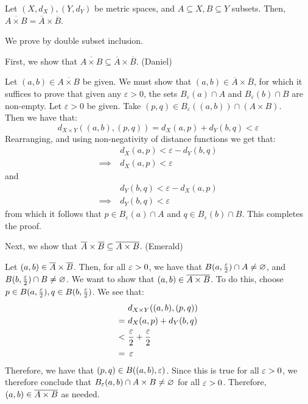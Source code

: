 \documentclass{article}
\begin{document}
\setcounter{subsection}{1}

\begin{thm}
    Let $ (X, d_{X}), (Y, d_{Y}) $ be metric spaces,
    and $ A \subseteq X, B \subseteq Y $ subsets.
    Then, $ \overline{A \times B} = \overline{A} \times \overline{B} $.
\end{thm}

\begin{pf}
    We prove by double subset inclusion. \npgh

    First, we show that $ \overline{A \times B} \subseteq \overline{A} \times \overline{B} $. (Daniel) \npgh
    
    Let $ (a, b) \in \overline{A \times B} $ be given.
    We must show that $ (a, b) \in \overline{A} \times \overline{B} $,
    for which it suffices to prove that given any $ \varepsilon > 0 $,
    the sets $ B_{\varepsilon}(a) \cap A $ and $ B_{\varepsilon}(b) \cap B $ are non-empty. \vsp
    Let $ \varepsilon > 0 $ be given.
    Take $ (p, q) \in B_{\varepsilon}((a,b)) \cap (A \times B) $. \\
    Then we have that:
    \begin{equation*}
        d_{X \times Y}((a,b), (p,q)) = d_X(a, p) + d_Y(b, q) < \varepsilon
    \end{equation*}
    Rearranging, and using non-negativity of distance functions we get that:
    \begin{align*}
        & d_X(a, p) < \varepsilon - d_Y(b, q) \\
        \implies \ & d_X(a, p) < \varepsilon
    \end{align*}
    and
    \begin{align*}
        & d_Y(b, q) < \varepsilon - d_X(a, p) \\
        \implies \ & d_Y(b, q) < \varepsilon
    \end{align*}
    from which it follows that $p\in B_{\varepsilon}(a)\cap A$ and $q\in B_{\varepsilon}(b)\cap B$.
    This completes the proof. \npgh

    Next, we show that $ \overline{A} \times \overline{B} \subseteq \overline{A \times B} $. (Emerald) \npgh
    
    Let $ (a, b) \in \overline{A} \times \overline{B} $.
    Then, for all $ \operatorname{\varepsilon} > 0 $, we have that $ B(a, \frac{\operatorname{\varepsilon}}{2}) \cap A \neq \varnothing $,
    and $ B(b, \frac{\operatorname{\varepsilon}}{2}) \cap B \neq \varnothing $.
    We want to show that $ (a, b) \in \overline{A \times B} $. \vsp
    To do this, choose $ p \in B(a, \frac{\operatorname{\varepsilon}}{2}), q \in B(b, \frac{\operatorname{\varepsilon}}{2}) $.
    We see that:
    \begin{align*}
        & d_{X \times Y}((a, b), (p, q)) \\
        = \ & d_{X}(a, p) + d_{Y}(b, q) \\
        < \ & \frac{\operatorname{\varepsilon}}{2} + \frac{\operatorname{\varepsilon}}{2} \\
        = \ & \operatorname{\varepsilon}
    \end{align*}
    Therefore, we have that $ (p, q) \in B((a, b), \operatorname{\varepsilon}) $.
    Since this is true for all $ \operatorname{\varepsilon} > 0 $, we therefore conclude that
    $ B_{\operatorname{\varepsilon}}(a, b) \cap A \times B \neq \varnothing $ for all $ \operatorname{\varepsilon} > 0 $.
    Therefore, $ (a, b) \in \overline{A \times B} $ as needed.
\end{pf}
\end{document}
